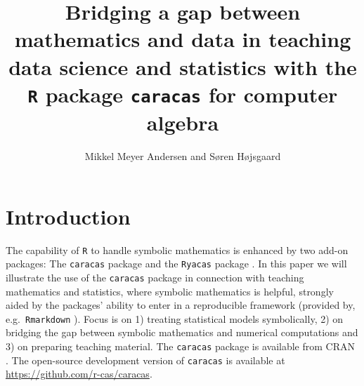 \documentclass[10pt,]{article}
\title{Bridging a gap between mathematics and data in teaching data science and
statistics with the \texttt{R} package \texttt{caracas} for computer
algebra}
\author{Mikkel Meyer Andersen and Søren Højsgaard}
\date{}
\begin{document}
\maketitle

\def\EE{\mathbf{E}}
\def\var{\mathbf{Var}}
\def\cov{\mathbf{Cov}}
\def\trace{\mathbf{tr}}
\def\det{\mathbf{det}}
\def\diag{\mathbf{diag}}
\def\proglang#1{\texttt{#1}}
\def\pkg#1{\texttt{#1}}

\def\sympy{\texttt{SymPy}}
\def\python{\texttt{Python}}
\def\caracas{\texttt{caracas}}
\def\r{\texttt{R}}

\def\bb{{b}}

\def\inv{^{-1}}
\def\transp{^\top}
\def\cip{\perp\!\!\perp}

\newcommand{\matrxr}[1]
{\left(
    \begin{array}{rrrrrrrrrrrrrrrrrrrrrrrrrrrrrrrrrrrrr}
      #1 \\
    \end{array}
  \right)}

\newcommand{\matrxc}[1]
{\left(
    \begin{array}{cccccccccccccccccccccccccccccccccccc}
      #1 \\
    \end{array}
  \right)}

\makeatletter
\renewcommand*\env@matrix[1][c]{\hskip -\arraycolsep
  \let\@ifnextchar\new@ifnextchar
  \array{*\c@MaxMatrixCols #1}}
\makeatother

\parindent0pt

\hypertarget{introduction}{%
\section{Introduction}\label{introduction}}

\label{sec:introduction}

The capability of \texttt{R} \citep{R} to handle symbolic mathematics is
enhanced by two add-on packages: The \texttt{caracas} package
\citep{caracas:21} and the \texttt{Ryacas} package \citep{ryacas}. In
this paper we will illustrate the use of the \texttt{caracas} package in
connection with teaching mathematics and statistics, where symbolic
mathematics is helpful, strongly aided by the packages' ability to enter
in a reproducible framework (provided by, e.g.~\texttt{Rmarkdown}
\citep{rmarkdown, RMarkdownDefinitiveGuide, RMarkdownCookbook}). Focus
is on 1) treating statistical models symbolically, 2) on bridging the
gap between symbolic mathematics and numerical computations and 3) on
preparing teaching material. The \texttt{caracas} package is available
from CRAN \citep{R}. The open-source development version of
\texttt{caracas} is available at \url{https://github.com/r-cas/caracas}.
\end{document}
